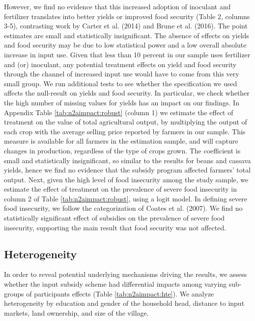 However, we find no evidence that this increased adoption of inoculant and fertilizer translates into better yields or improved food security (Table 2, columns 3-5), contrasting work by Carter et al. (2014) and Brune et al. (2016). The point estimates are small and statistically insignificant. The absence of effects on yields and food security may be due to low statistical power and a low overall absolute increase in input use. Given that less than 10 percent in our sample uses fertilizer and (or) inoculant, any potential treatment effects on yield and food security through the channel of increased input use would have to come from this very small group.
We run additional tests to see whether the specification we used affects the null-result on yields and food security. In particular, we check whether the high number of missing values for yields has an impact on our findings. In Appendix Table \ref{tab:n2aimpact:robust} (column 1) we estimate the effect of treatment on the value of total agricultural output, by multiplying the output of each crop with the average selling price reported by farmers in our sample. This measure is available for all farmers in the estimation sample, and will capture changes in production, regardless of the type of crops grown.  The coefficient is small and statistically insignificant, so similar to the results for beans and cassava yields, hence we find no evidence that the subsidy program affected farmers’ total output. Next, given the high level of food insecurity among the study sample, we estimate the effect of treatment on the prevalence of severe food insecurity in column 2 of Table \ref{tab:n2aimpact:robust}, using a logit model. In defining severe food insecurity, we follow the categorization of Coates et al. (2007). We find no statistically significant effect of subsidies on the prevalence of severe food insecurity, supporting the main result that food security was not affected.



\subsection{Heterogeneity}
In order to reveal potential underlying mechanisms driving the results, we assess whether the input subsidy scheme had differential impacts among varying sub-groups of participants effects (Table \ref{tab:n2aimpact:hte}).  We analyze heterogeneity by education and gender of the household head, distance to input markets, land ownership, and size of the village. 

